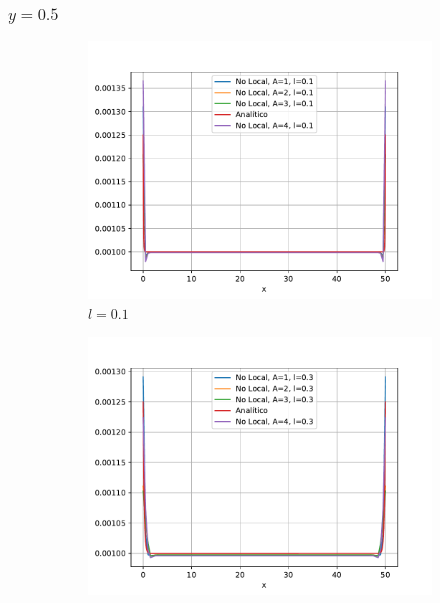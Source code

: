 	\subsubsection{\texorpdfstring{$y=0.5$}{y=0.5}}
		\begin{figure}
		    \centering
		    \sffamily
		    \begin{subfigure}{0.48\textwidth}
		    \centering
		        \includegraphics[width=\textwidth]{figuras/Barra/Perfiles/Y/Y0.1_0.5.pdf}
		        \caption{$l=0.1$}
		        \label{fig:perfilesbarraY05.01}
		    \end{subfigure}
		    \begin{subfigure}{0.48\textwidth}
		    \centering
		        \includegraphics[width=\textwidth]{figuras/Barra/Perfiles/Y/Y0.3_0.5.pdf}

\end{subfigure}
\end{figure}
